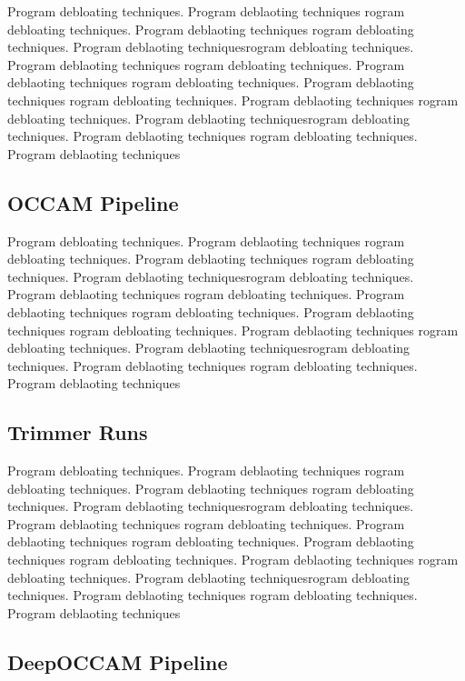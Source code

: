 \documentclass{relatorio}
\begin{document}
Program debloating techniques. Program deblaoting techniques rogram debloating techniques. Program deblaoting techniques
rogram debloating techniques. Program deblaoting techniquesrogram debloating techniques. Program deblaoting techniques
rogram debloating techniques. Program deblaoting techniques rogram debloating techniques. Program deblaoting techniques
rogram debloating techniques. Program deblaoting techniques 
rogram debloating techniques. Program deblaoting techniquesrogram debloating techniques. Program deblaoting techniques
rogram debloating techniques. Program deblaoting techniques

\subsection{OCCAM Pipeline}%
\label{Tools}

Program debloating techniques. Program deblaoting techniques rogram debloating techniques. Program deblaoting techniques
rogram debloating techniques. Program deblaoting techniquesrogram debloating techniques. Program deblaoting techniques
rogram debloating techniques. Program deblaoting techniques rogram debloating techniques. Program deblaoting techniques
rogram debloating techniques. Program deblaoting techniques 
rogram debloating techniques. Program deblaoting techniquesrogram debloating techniques. Program deblaoting techniques
rogram debloating techniques. Program deblaoting techniques

\subsection{Trimmer Runs}%
\label{Tools}

Program debloating techniques. Program deblaoting techniques rogram debloating techniques. Program deblaoting techniques
rogram debloating techniques. Program deblaoting techniquesrogram debloating techniques. Program deblaoting techniques
rogram debloating techniques. Program deblaoting techniques rogram debloating techniques. Program deblaoting techniques
rogram debloating techniques. Program deblaoting techniques 
rogram debloating techniques. Program deblaoting techniquesrogram debloating techniques. Program deblaoting techniques
rogram debloating techniques. Program deblaoting techniques

\subsection{DeepOCCAM Pipeline}%
\label{Tools}
\end{document}
